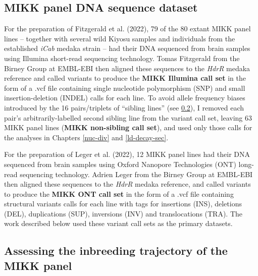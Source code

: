 \documentclass[
]{book}
\begin{document}
\hypertarget{non-sib-calls}{%
\subsection{MIKK panel DNA sequence dataset}\label{non-sib-calls}}

For the preparation of Fitzgerald et al. (2022), 79 of the 80 extant MIKK panel lines -- together with several wild Kiyosu samples and individuals from the established \emph{iCab} medaka strain -- had their DNA sequenced from brain samples using Illumina short-read sequencing technology. Tomas Fitzgerald from the Birney Group at EMBL-EBI then aligned these sequences to the \emph{HdrR} medaka reference and called variants to produce the \textbf{MIKK Illumina call set} in the form of a .vcf file containing single nucleotide polymorphism (SNP) and small insertion-deletion (INDEL) calls for each line. To avoid allele frequency biases introduced by the 16 pairs/triplets of ``sibling lines'' (see \ref{inbreeding-sec}), I removed each pair's arbitrarily-labelled second sibling line from the variant call set, leaving 63 MIKK panel lines (\textbf{MIKK non-sibling call set}), and used only those calls for the analyses in Chapters \ref{nuc-div} and \ref{ld-decay-sec}.

For the preparation of Leger et al. (2022), 12 MIKK panel lines had their DNA sequenced from brain samples using Oxford Nanopore Technologies (ONT) long-read sequencing technology. Adrien Leger from the Birney Group at EMBL-EBI then aligned these sequences to the \emph{HdrR} medaka reference, and called variants to produce the \textbf{MIKK ONT call set} in the form of a .vcf file containing structural variants calls for each line with tags for insertions (INS), deletions (DEL), duplications (SUP), inversions (INV) and translocations (TRA). The work described below used these variant call sets as the primary datasets.

\hypertarget{inbreeding-sec}{%
\subsection{Assessing the inbreeding trajectory of the MIKK panel}\label{inbreeding-sec}}
\end{document}
